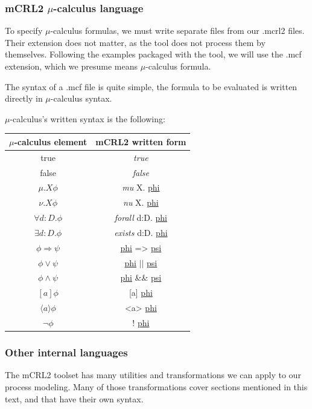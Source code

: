 \documentclass[11pt]{article}
\theoremstyle{definition}
\theoremstyle{plain}
\theoremstyle{definition}
\let\temp\phi
\let\phi\varphi
\let\varphi\temp
\begin{document}
\subsubsection{mCRL2 $ \mu $-calculus language}

To specify $ \mu $-calculus formulas, we must write separate files from our .mcrl2 files. Their extension does not matter, as the tool does not process them by themselves. Following the examples packaged with the tool, we will use the .mcf extension, which we presume means $ \mu $-calculus formula.

The syntax of a .mcf file is quite simple, the formula to be evaluated is written directly in $ \mu $-calculus syntax. 

$ \mu $-calculus's written syntax is the following:

\begin{tabular}{c c}
	$ \mu $-calculus element & mCRL2 written form \\
	\hline
	true & \textit{true} \\
	false & \textit{false} \\
	$ \mu . X \phi $ & \textit{mu} X. \underline{phi} \\
	$ \nu . X \phi $ & \textit{nu} X. \underline{phi} \\
	$ \forall d:D.\phi $ & \textit{forall} d:D. \underline{phi} \\
	$ \exists d:D.\phi $ & \textit{exists} d:D. \underline{phi} \\
	$ \phi \Rightarrow \psi $ & \underline{phi} => \underline{psi} \\
	$ \phi \vee \psi $ & \underline{phi} $ \vert \vert $ \underline{psi} \\	
	$ \phi \wedge \psi $ & \underline{phi} \&\& \underline{psi} \\
	$ [a] \phi $ & [a] \underline{phi} \\
	$ \langle a\rangle \phi $ & <a> \underline{phi} \\
	$ \neg \phi $ & ! \underline{phi} \\
\end{tabular} 

\subsubsection{Other internal languages}

The mCRL2 toolset has many utilities and transformations we can apply to our process modeling. Many of those transformations cover sections mentioned in this text, and that have their own syntax.
\end{document}
